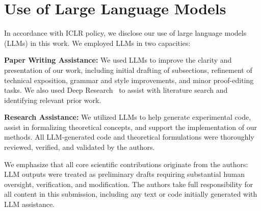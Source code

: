 
\section{Use of Large Language Models}

In accordance with ICLR policy, we disclose our use of large language models (LLMs) in this work. We employed LLMs in two capacities:

\textbf{Paper Writing Assistance:} We used LLMs to improve the clarity and presentation of our work, including initial drafting of subsections, refinement of technical exposition, grammar and style improvements, and minor proof-editing tasks. We also used Deep Research~\citep{openai2025deepresearch} to assist with literature search and identifying relevant prior work.

\textbf{Research Assistance:} We utilized LLMs to help generate experimental code, assist in formalizing theoretical concepts, and support the implementation of our methods. All LLM-generated code and theoretical formulations were thoroughly reviewed, verified, and validated by the authors.

We emphasize that all core scientific contributions originate from the authors: LLM outputs were treated as preliminary drafts requiring substantial human oversight, verification, and modification. The authors take full responsibility for all content in this submission, including any text or code initially generated with LLM assistance.

